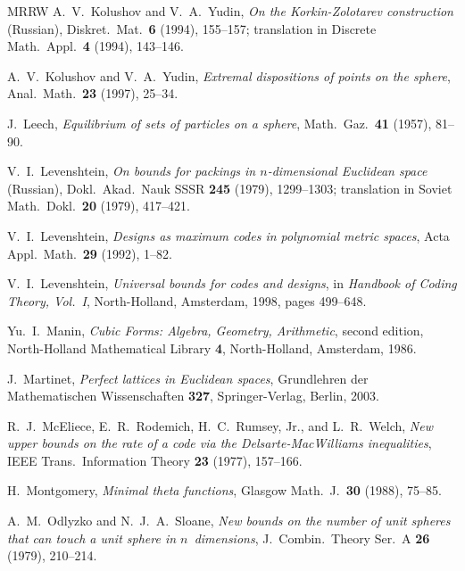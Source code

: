 \documentclass{jams-l}
\theoremstyle{plain}
\numberwithin{theorem}{section}
\theoremstyle{definition}
\numberwithin{equation}{section}
\begin{document}
\begin{thebibliography}{MRRW}
 A.~V.~Kolushov and V.~A.~Yudin, \textit{On the
Korkin-Zolotarev construction\/}
(Russian), Diskret.\ Mat.\ \textbf{6} (1994), 155--157; translation in
Discrete Math.\ Appl.\ \textbf{4} (1994), 143--146.

 A.~V.~Kolushov and V.~A.~Yudin, \textit{Extremal
dispositions of points on the sphere\/}, Anal.\ Math.\ {\bf 23}
(1997), 25--34.

 J.~Leech, \textit{Equilibrium of sets of particles
on a sphere\/}, Math.\ Gaz.\ {\bf 41} (1957), 81--90.

 V.~I.~Levenshtein, \textit{On bounds for packings in
$n$-dimensional Euclidean space\/} (Russian), Dokl.\ Akad.\ Nauk
SSSR \textbf{245} (1979), 1299--1303; translation in Soviet Math.\
Dokl.\ \textbf{20} (1979), 417--421. 

 V.~I.~Levenshtein, \textit{Designs as maximum codes
in polynomial metric spaces\/}, Acta Appl.\ Math.\ {\bf 29}
(1992), 1--82. 

 V.~I.~Levenshtein, \textit{Universal bounds for codes
and designs\/}, in \textit{Handbook of Coding Theory, Vol.\ I\/},
North-Holland, Amsterdam, 1998, pages 499--648.

 Yu.~I.~Manin, \textit{Cubic Forms: Algebra, Geometry,
Arithmetic\/}, second edition, North-Holland Mathematical Library
\textbf{4}, North-Holland, Amsterdam, 1986.

J.~Martinet, \textit{Perfect lattices in Euclidean spaces\/},
Grundlehren der Mathematischen Wissenschaften \textbf{327},
Springer-Verlag, Berlin, 2003. 

 R.~J.~McEliece, E.~R.~Rodemich, H.~C.~Rumsey, Jr.,
and L.~R.~Welch, \textit{New upper bounds on the rate of a code
via the Delsarte-MacWilliams inequalities\/}, IEEE Trans.\ Information
Theory \textbf{23} (1977), 157--166.

H.~Montgomery, \textit{Minimal theta functions\/}, Glasgow Math.\
J.\ \textbf{30} (1988), 75--85. 

 A.~M.~Odlyzko and N.~J.~A.~Sloane, \textit{New bounds
on the number of unit spheres that can touch a unit sphere in
$n$~dimensions\/}, J.\ Combin.\ Theory Ser.\ A \textbf{26}
(1979), 210--214.
\MR{0530296 (81d:52010)}


\end{thebibliography}
\end{document}
